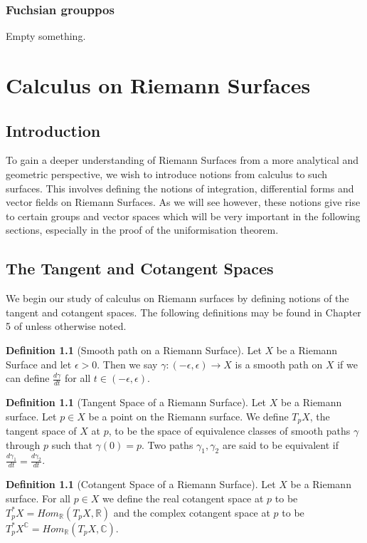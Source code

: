 \documentclass[a4paper,12pt]{report}
\theoremstyle{plain}
\theoremstyle{definition}
\newtheorem{defn}[thm]{Definition}
\begin{document}
\subsection{Fuchsian grouppos}
Empty something.

\chapter{Calculus on Riemann Surfaces}
\section{Introduction}
To gain a deeper understanding of Riemann Surfaces from a more analytical
and geometric perspective, we wish to introduce notions from calculus to
such surfaces. This involves defining the notions of integration,
differential forms and vector fields on Riemann Surfaces. As we will see
however, these notions give rise to certain groups and vector spaces
which will be very important in the following sections, especially in the
proof of the uniformisation theorem.

\section{The Tangent and Cotangent Spaces}
We begin our study of calculus on Riemann surfaces by defining notions of
the tangent and cotangent spaces. The following definitions may be found
in Chapter 5 of \cite{donaldson} unless otherwise noted.

\begin{defn}[Smooth path on a Riemann Surface]\label{Smooth Path}
  Let $X$ be a Riemann Surface and let $\epsilon > 0$. Then we say
  $\gamma:(-\epsilon,\epsilon) \rightarrow X$ is a smooth path on $X$ if
  we can define $\frac{d\gamma}{dt}$ for all $t \in (-\epsilon,\epsilon)$.
\end{defn}

\begin{defn}[Tangent Space of a Riemann Surface]\label{TpX}
  Let $X$ be a Riemann surface. Let $p \in X$ be a point on the Riemann
  surface. We define $T_pX$, the tangent space of $X$ at
  $p$, to be the
  space of equivalence classes of smooth paths $\gamma$ through $p$ such
  that $\gamma(0)=p$. Two paths $\gamma_1, \gamma_2$ are said to be
  equivalent if $\frac{d\gamma_1}{dt}=\frac{d\gamma_2}{dt}$.
\end{defn}

\begin{defn}[Cotangent Space of a Riemann Surface]\label{T*pX}
  Let $X$ be a Riemann surface. For all $p \in X$ we define the real
  cotangent space at $p$ to be
  $T^*_pX = Hom_{\mathbb{R}}(T_pX, \mathbb{R})$ and the complex cotangent
  space at $p$ to be
  $T^*_pX^{\mathbb{C}} = Hom_{\mathbb{R}}(T_pX,\mathbb{C})$.
\end{defn}
\end{document}
